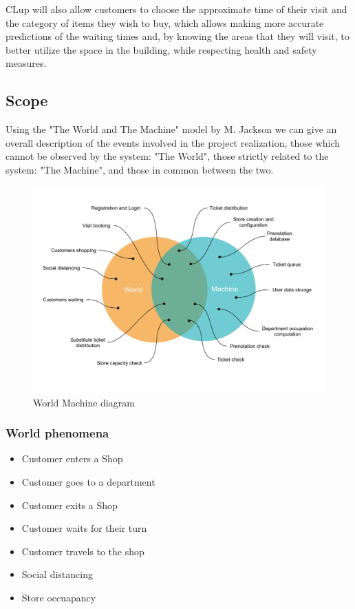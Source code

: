 CLup will also allow customers to choose the approximate time of their visit and the category of items they wish to buy, which allows making more accurate predictions of the waiting times and, by knowing the areas that they will visit, to better utilize the space in the building, while respecting health and safety measures.

\subsection{Scope}

Using the "The World and The Machine" model by M. Jackson we can give an overall description of the events involved in the project realization, those which cannot be observed by the system: "The World", those strictly related to the system: "The Machine", and those in common between the two.

\begin{figure}[h]
    \centering
    \includegraphics[width=.85\textwidth]{Images/world-machine.pdf}
    \caption{\label{fig:world_machine} World Machine diagram }
\end{figure}

\subsubsection{World phenomena}
\begin{itemize}
    \item Customer enters a Shop
    \item Customer goes to a department
    \item Customer exits a Shop
    \item Customer waits for their turn
    \item Customer travels to the shop
    \item Social distancing
    \item Store occuapancy
\end{itemize}

